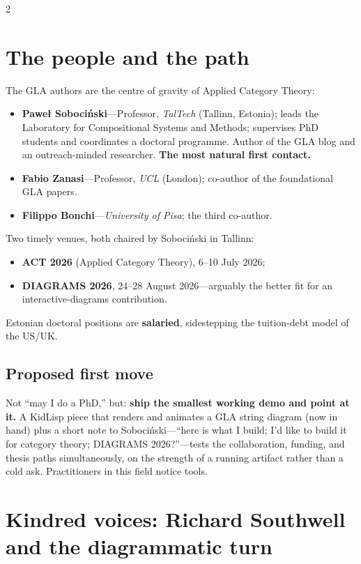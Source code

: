 \documentclass[11pt, letterpaper]{article}
\begin{document}
\begin{multicols}{2}
\section{The people and the path}

The GLA authors are the centre of gravity of Applied Category Theory:

\begin{itemize}
  \item \textbf{Pawe\l{} Soboci\'nski}---Professor, \emph{TalTech}
    (Tallinn, Estonia); leads the Laboratory for Compositional Systems and
    Methods; supervises PhD students and coordinates a doctoral programme.
    Author of the GLA blog and an outreach-minded researcher. \textbf{The
    most natural first contact.}
  \item \textbf{Fabio Zanasi}---Professor, \emph{UCL} (London);
    co-author of the foundational GLA papers.
  \item \textbf{Filippo Bonchi}---\emph{University of Pisa}; the third
    co-author.
\end{itemize}

Two timely venues, both chaired by Soboci\'nski in Tallinn:

\begin{itemize}
  \item \textbf{ACT 2026} (Applied Category Theory), 6--10 July 2026;
  \item \textbf{DIAGRAMS 2026}, 24--28 August 2026---arguably the better
    fit for an interactive-diagrams contribution.
\end{itemize}

Estonian doctoral positions are \textbf{salaried}, sidestepping the
tuition-debt model of the US/UK.

\subsection*{Proposed first move}

Not ``may I do a PhD,'' but: \textbf{ship the smallest working demo and
point at it.} A KidLisp piece that renders and animates a GLA string
diagram (now in hand) plus a short note to Soboci\'nski---``here is what I
build; I'd like to build it for category theory; DIAGRAMS 2026?''---tests
the collaboration, funding, and thesis paths simultaneously, on the
strength of a running artifact rather than a cold ask. Practitioners in
this field notice tools.

\section{Kindred voices: Richard Southwell and the diagrammatic turn}


\end{multicols}
\end{document}
